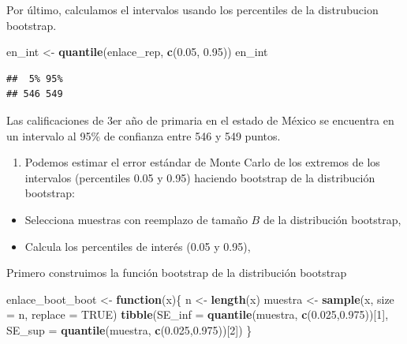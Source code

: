 \documentclass[]{article}
\newenvironment{Shaded}{\begin{snugshade}}{\end{snugshade}}
\newcommand{\ControlFlowTok}[1]{\textcolor[rgb]{0.13,0.29,0.53}{\textbf{#1}}}
\newcommand{\DataTypeTok}[1]{\textcolor[rgb]{0.13,0.29,0.53}{#1}}
\newcommand{\DecValTok}[1]{\textcolor[rgb]{0.00,0.00,0.81}{#1}}
\newcommand{\FloatTok}[1]{\textcolor[rgb]{0.00,0.00,0.81}{#1}}
\newcommand{\KeywordTok}[1]{\textcolor[rgb]{0.13,0.29,0.53}{\textbf{#1}}}
\newcommand{\NormalTok}[1]{#1}
\newcommand{\OtherTok}[1]{\textcolor[rgb]{0.56,0.35,0.01}{#1}}
\newcommand{\StringTok}[1]{\textcolor[rgb]{0.31,0.60,0.02}{#1}}
\providecommand{\tightlist}{%
  \setlength{\itemsep}{0pt}\setlength{\parskip}{0pt}}
\begin{document}
Por último, calculamos el intervalos usando los percentiles de la
distrubucion bootstrap.

\begin{Shaded}
\begin{Highlighting}[]
\NormalTok{en_int <-}\StringTok{ }\KeywordTok{quantile}\NormalTok{(enlace_rep, }\KeywordTok{c}\NormalTok{(}\FloatTok{0.05}\NormalTok{, }\FloatTok{0.95}\NormalTok{))}
\NormalTok{en_int}
\end{Highlighting}
\end{Shaded}

\begin{verbatim}
##  5% 95% 
## 546 549
\end{verbatim}

Las calificaciones de 3er año de primaria en el estado de México se
encuentra en un intervalo al 95\% de confianza entre 546 y 549 puntos.

\begin{enumerate}
\def\labelenumi{\arabic{enumi}.}
\setcounter{enumi}{1}
\tightlist
\item
  Podemos estimar el error estándar de Monte Carlo de los extremos de
  los intervalos (percentiles 0.05 y 0.95) haciendo bootstrap de la
  distribución bootstrap:
\end{enumerate}

\begin{itemize}
\tightlist
\item
  Selecciona muestras con reemplazo de tamaño \(B\) de la distribución
  bootstrap,
\item
  Calcula los percentiles de interés (0.05 y 0.95),
\end{itemize}

Primero construimos la función bootstrap de la distribución bootstrap

\begin{Shaded}
\begin{Highlighting}[]
\NormalTok{enlace_boot_boot <-}\StringTok{ }\ControlFlowTok{function}\NormalTok{(x)\{}
\NormalTok{  n <-}\StringTok{ }\KeywordTok{length}\NormalTok{(x)}
\NormalTok{  muestra <-}\StringTok{ }\KeywordTok{sample}\NormalTok{(x, }\DataTypeTok{size =}\NormalTok{ n, }\DataTypeTok{replace =} \OtherTok{TRUE}\NormalTok{)}
  \KeywordTok{tibble}\NormalTok{(}\DataTypeTok{SE_inf =} \KeywordTok{quantile}\NormalTok{(muestra, }\KeywordTok{c}\NormalTok{(}\FloatTok{0.025}\NormalTok{,}\FloatTok{0.975}\NormalTok{))[}\DecValTok{1}\NormalTok{], }\DataTypeTok{SE_sup =} \KeywordTok{quantile}\NormalTok{(muestra, }\KeywordTok{c}\NormalTok{(}\FloatTok{0.025}\NormalTok{,}\FloatTok{0.975}\NormalTok{))[}\DecValTok{2}\NormalTok{])}
\NormalTok{\}}
\end{Highlighting}
\end{Shaded}
\end{document}
